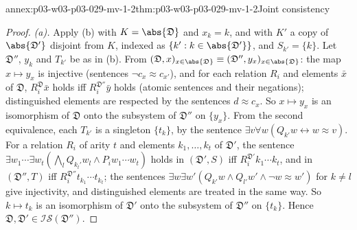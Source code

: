 \begin{annexitem}{annex:p03-w03-p03-029-mv-1-2}{thm:p03-w03-p03-029-mv-1-2}{Joint consistency}
\begin{proof}
\emph{(a).} Apply (b) with \(K=\abs{\mathfrak D}\) and \(x_k=k\), and with
\(K'\) a copy of \(\abs{\mathfrak D'}\) disjoint from \(K\), indexed as
\(\{k':k\in\abs{\mathfrak D'}\}\), and \(S_{k'}=\{k\}\). Let \(\mathfrak D''\),
\(y_k\) and \(T_{k'}\) be as in (b). From
\((\mathfrak D,x)_{x\in\abs{\mathfrak D}}\equiv(\mathfrak
D'',y_x)_{x\in\abs{\mathfrak D}}\): the map \(x\mapsto y_x\) is injective
(sentences \(\neg c_x\approx c_{x'}\)), and for each relation \(R_i\) and
elements \(\bar x\) of \(\mathfrak D\), \(R_i^{\mathfrak D}\bar x\) holds iff
\(R_i^{\mathfrak D''}\bar y\) holds (atomic sentences and their negations);
distinguished elements are respected by the sentences \(d\approx c_x\). So
\(x\mapsto y_x\) is an isomorphism of \(\mathfrak D\) onto the subsystem of
\(\mathfrak D''\) on \(\{y_x\}\). From the second equivalence, each
\(T_{k'}\) is a singleton \(\{t_k\}\), by the sentence \(\exists
v\forall w(Q_{k'}w\leftrightarrow w\approx v)\). For a relation \(R_i\) of
arity \(t\) and elements \(k_1,\ldots,k_t\) of \(\mathfrak D'\), the sentence
\(\exists w_1\cdots\exists w_t(\bigwedge_lQ_{k_l'}w_l\wedge P_iw_1\cdots
w_t)\) holds in \((\mathfrak D',S)\) iff \(R_i^{\mathfrak D'}k_1\cdots k_t\),
and in \((\mathfrak D'',T)\) iff \(R_i^{\mathfrak D''}t_{k_1}\cdots
t_{k_t}\); the sentences \(\exists w\exists w'(Q_{k'}w\wedge
Q_{l'}w'\wedge\neg w\approx w')\) for \(k\neq l\) give injectivity, and
distinguished elements are treated in the same way. So \(k\mapsto t_k\) is an
isomorphism of \(\mathfrak D'\) onto the subsystem of \(\mathfrak D''\) on
\(\{t_k\}\). Hence \(\mathfrak D,\mathfrak D'\in\mathscr I\mathscr
S(\mathfrak D'')\).
\end{proof}
\end{annexitem}

